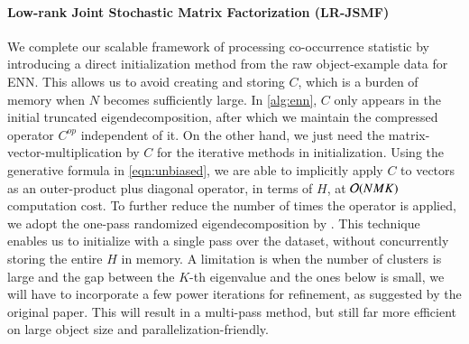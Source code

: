 \paragraph{Low\hyp{}rank Joint Stochastic Matrix Factorization (LR\hyp{}JSMF)} 
We complete our scalable framework of processing co\hyp{}occurrence statistic by
introducing a direct initialization method from the raw object\hyp{}example data
for ENN. This allows us to avoid creating and storing $C$, which is a burden
of memory when $N$ becomes sufficiently large. In \cref{alg:enn}, $C$ only
appears in the initial truncated eigendecomposition, after which we maintain the
compressed operator $C^{op}$ independent of it. On the other hand, we just need
the matrix\hyp{}vector\hyp{}multiplication by $C$ for the iterative methods in
initialization. Using the generative formula in \cref{eqn:unbiased}, we are able
to implicitly apply $C$ to vectors as an outer\hyp{}product plus diagonal
operator, in terms of $H$, at $\mathcal{O}(NMK)$ computation cost. To further reduce
the number of times the operator is applied, we adopt the one\hyp{}pass
randomized eigendecomposition by \citet{halko2011finding}. This technique
enables us to initialize with a single pass over the dataset, without
concurrently storing the entire $H$ in memory. A limitation is when the number
of clusters is large and the gap between the $K$\hyp{}th eigenvalue and the ones
below is small, we will have to incorporate a few power iterations for
refinement, as suggested by the original paper. This will result in a 
multi\hyp{}pass method, but still far more efficient on large object size and
parallelization\hyp{}friendly.